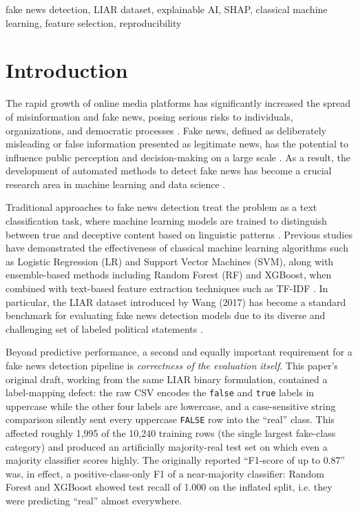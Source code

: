 \documentclass[conference]{IEEEtran}
\begin{document}
\begin{IEEEkeywords}
fake news detection, LIAR dataset, explainable AI, SHAP, classical machine learning,
feature selection, reproducibility
\end{IEEEkeywords}

\section{Introduction}
The rapid growth of online media platforms has significantly increased the spread of
misinformation and fake news, posing serious risks to individuals, organizations,
and democratic processes \cite{conroy2015}. Fake news, defined as deliberately
misleading or false information presented as legitimate news, has the potential to
influence public perception and decision-making on a large scale \cite{feng2012}.
As a result, the development of automated methods to detect fake news has become a
crucial research area in machine learning and data science \cite{shu2017}.

Traditional approaches to fake news detection treat the problem as a text
classification task, where machine learning models are trained to distinguish
between true and deceptive content based on linguistic patterns \cite{perezrosas2015}.
Previous studies have demonstrated the effectiveness of classical machine learning
algorithms such as Logistic Regression (LR) and Support Vector Machines (SVM),
along with ensemble-based methods including Random Forest (RF) and XGBoost, when
combined with text-based feature extraction techniques such as TF-IDF
\cite{salton1988}. In particular, the LIAR dataset introduced by Wang (2017) has
become a standard benchmark for evaluating fake news detection models due to its
diverse and challenging set of labeled political statements \cite{wang2017}.

Beyond predictive performance, a second and equally important requirement for a
fake news detection pipeline is \emph{correctness of the evaluation itself}. This
paper's original draft, working from the same LIAR binary formulation, contained a
label-mapping defect: the raw CSV encodes the \texttt{false} and \texttt{true}
labels in uppercase while the other four labels are lowercase, and a
case-sensitive string comparison silently sent every uppercase \texttt{FALSE} row
into the ``real'' class. This affected roughly 1,995 of the 10,240 training rows
(the single largest fake-class category) and produced an artificially majority-real
test set on which even a majority classifier scores highly. The originally reported
``F1-score of up to 0.87'' was, in effect, a positive-class-only F1 of a
near-majority classifier: Random Forest and XGBoost showed test recall of 1.000 on
the inflated split, i.e. they were predicting ``real'' almost everywhere.
\end{document}
